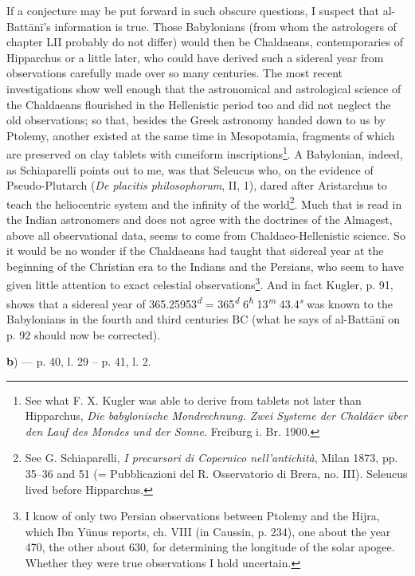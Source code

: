 \documentclass[11pt]{article}
\newcommand{\Pg}[1]{\marginpar{\footnotesize\color{gray}#1}}
\begin{document}
\par \Pg{I 209}If a conjecture may be put forward in such obscure questions, I suspect that al-Battānī's information is true. Those Babylonians (from whom the astrologers of chapter LII probably do not differ) would then be Chaldaeans, contemporaries of Hipparchus or a little later, who could have derived such a sidereal year from observations carefully made over so many centuries. The most recent investigations show well enough that the astronomical and astrological science of the Chaldaeans flourished in the Hellenistic period too and did not neglect the old observations; so that, besides the Greek astronomy handed down to us by Ptolemy, another existed at the same time in Mesopotamia, fragments of which are preserved on clay tablets with cuneiform inscriptions\footnote{See what F. X. Kugler was able to derive from tablets not later than Hipparchus, \emph{Die babylonische Mondrechnung. Zwei Systeme der Chaldäer über den Lauf des Mondes und der Sonne.} Freiburg i. Br. 1900.}. A Babylonian, indeed, as Schiaparelli points out to me, was that Seleucus who, on the evidence of Pseudo-Plutarch (\emph{De placitis philosophorum}, II, 1), dared after Aristarchus to teach the heliocentric system and the infinity of the world\footnote{See G. Schiaparelli, \emph{I precursori di Copernico nell’antichità}, Milan 1873, pp. 35–36 and 51 (= Pubblicazioni del R. Osservatorio di Brera, no. III). Seleucus lived before Hipparchus.}. Much that is read in the Indian astronomers and does not agree with the doctrines of the Almagest, above all observational data, seems to come from Chaldaeo-Hellenistic science. So it would be no wonder if the Chaldaeans had taught that sidereal year at the beginning of the Christian era to the Indians and the Persians, who seem to have given little attention to exact celestial observations\footnote{I know of only two Persian observations between Ptolemy and the Hijra, which Ibn Yūnus reports, ch. VIII (in Caussin, p. 234), one about the year 470, the other about 630, for determining the longitude of the solar apogee. Whether they were true observations I hold uncertain.}. And in fact Kugler, p. 91, shows that a sidereal year of 365.25953\textsuperscript{\itshape d} = 365\textsuperscript{\itshape d} 6\textsuperscript{\itshape h} 13\textsuperscript{\itshape m} 43.4\textsuperscript{\itshape s} was known to the Babylonians in the fourth and third centuries BC (what he says of al-Battānī on p. 92 should now be corrected).\par
\par\begin{center}\textbf{b}) — p. 40, l. 29 – p. 41, l. 2.\end{center}
\end{document}
